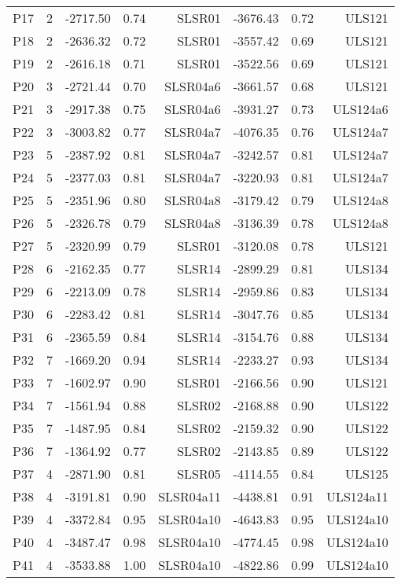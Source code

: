 \begin{center}
\begin{longtable}{|c|c|rrr|rrr|}
P17 & 2 & -2717.50 & 0.74 & SLSR01 & -3676.43 & 0.72 & ULS121\\
P18 & 2 & -2636.32 & 0.72 & SLSR01 & -3557.42 & 0.69 & ULS121\\
P19 & 2 & -2616.18 & 0.71 & SLSR01 & -3522.56 & 0.69 & ULS121\\
P20 & 3 & -2721.44 & 0.70 & SLSR04a6 & -3661.57 & 0.68 & ULS121\\
P21 & 3 & -2917.38 & 0.75 & SLSR04a6 & -3931.27 & 0.73 & ULS124a6\\
P22 & 3 & -3003.82 & 0.77 & SLSR04a7 & -4076.35 & 0.76 & ULS124a7\\
P23 & 5 & -2387.92 & 0.81 & SLSR04a7 & -3242.57 & 0.81 & ULS124a7\\
P24 & 5 & -2377.03 & 0.81 & SLSR04a7 & -3220.93 & 0.81 & ULS124a7\\
P25 & 5 & -2351.96 & 0.80 & SLSR04a8 & -3179.42 & 0.79 & ULS124a8\\
P26 & 5 & -2326.78 & 0.79 & SLSR04a8 & -3136.39 & 0.78 & ULS124a8\\
P27 & 5 & -2320.99 & 0.79 & SLSR01 & -3120.08 & 0.78 & ULS121\\
P28 & 6 & -2162.35 & 0.77 & SLSR14 & -2899.29 & 0.81 & ULS134\\
P29 & 6 & -2213.09 & 0.78 & SLSR14 & -2959.86 & 0.83 & ULS134\\
P30 & 6 & -2283.42 & 0.81 & SLSR14 & -3047.76 & 0.85 & ULS134\\
P31 & 6 & -2365.59 & 0.84 & SLSR14 & -3154.76 & 0.88 & ULS134\\
P32 & 7 & -1669.20 & 0.94 & SLSR14 & -2233.27 & 0.93 & ULS134\\
P33 & 7 & -1602.97 & 0.90 & SLSR01 & -2166.56 & 0.90 & ULS121\\
P34 & 7 & -1561.94 & 0.88 & SLSR02 & -2168.88 & 0.90 & ULS122\\
P35 & 7 & -1487.95 & 0.84 & SLSR02 & -2159.32 & 0.90 & ULS122\\
P36 & 7 & -1364.92 & 0.77 & SLSR02 & -2143.85 & 0.89 & ULS122\\
P37 & 4 & -2871.90 & 0.81 & SLSR05 & -4114.55 & 0.84 & ULS125\\
P38 & 4 & -3191.81 & 0.90 & SLSR04a11 & -4438.81 & 0.91 & ULS124a11\\
P39 & 4 & -3372.84 & 0.95 & SLSR04a10 & -4643.83 & 0.95 & ULS124a10\\
P40 & 4 & -3487.47 & 0.98 & SLSR04a10 & -4774.45 & 0.98 & ULS124a10\\
P41 & 4 & -3533.88 & 1.00 & SLSR04a10 & -4822.86 & 0.99 & ULS124a10\\

\end{longtable}
\end{center}
